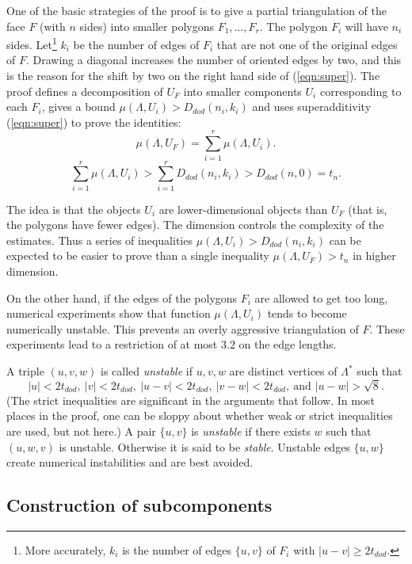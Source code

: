 \documentclass{article} %
\begin{document}
One of the basic strategies of the proof is to give a partial triangulation
of the face $F$ (with $n$ sides)
into smaller polygons $F_1,\ldots,F_r$.   The polygon
$F_i$ will have $n_i$ sides.  Let\footnote{More accurately,
$k_i$ is the number of edges $\{u,v\}$ of $F_i$ with $|u-v|\ge 2t_{dod}$.} 
$k_i$ be the number of edges
of $F_i$ that are not one of the original edges of $F$. 
Drawing a diagonal increases the number of oriented edges by
two, and this is the reason for the shift by two on the right
hand side of (\ref{eqn:super}).   The proof defines
a decomposition of $U_F$ into smaller components $U_i$ corresponding
to each $F_i$, gives a bound $\mu(\Lambda,U_i) > D_{dod}(n_i,k_i)$
and uses superadditivity (\ref{eqn:super}) to prove the identities:
\begin{equation}\label{eqn:mu}
  \mu(\Lambda,U_F) = \sum_{i=1}^r \mu(\Lambda,U_i).
\end{equation}
\begin{equation}\label{eqn:super-mu}
\sum_{i=1}^r \mu(\Lambda,U_i) > \sum_{i=1}^r D_{dod}(n_i,k_i)
 > D_{dod}(n,0) = t_n.
\end{equation}

The idea is that the objects $U_i$ are lower-dimensional objects
than $U_F$ (that is, the polygons  have fewer edges).
The dimension controls the complexity
of the estimates.  Thus a series of inequalities $\mu(\Lambda,U_i) > D_{dod}(n_i,k_i)$
can be expected to be easier to prove than a single inequality
$\mu(\Lambda,U_F) > t_n$ in higher dimension.  

On the other hand, if the edges of the polygons $F_i$ are allowed
to get too long, numerical experiments show that function $\mu(\Lambda,U_i)$
tends to become numerically unstable.  This prevents 
an overly aggressive  triangulation of $F$.
These experiments lead
 to a restriction of at most $3.2$ on the edge lengths.

A triple $(u,v,w)$ is called {\it unstable}
if $u,v,w$ are distinct vertices of $\Lambda^*$ such
that 
$$
|u| < 2t_{dod},\ |v| < 2 t_{dod},\ |u-v|< 2t_{dod},\  |v-w|< 2t_{dod},\ \text{and } |u-w|>\sqrt8.$$  
(The strict inequalities are significant in the arguments that follow.
In most places in the proof, one can be sloppy about whether weak or
strict inequalities are used, but not here.) A pair $\{u,v\}$ is {\it
unstable} if there exists $w$ such that $(u,w,v)$ is unstable.
Otherwise it is said to be {\it stable}. Unstable edges $\{u,w\}$
create numerical instabilities and are best avoided.

\subsection{Construction of subcomponents}
\label{sec:sub}
\end{document}
